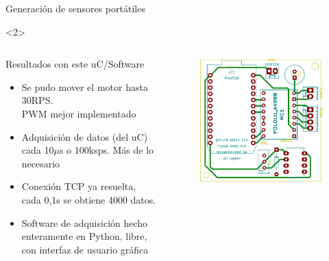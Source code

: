 \begin{frame}{Generación de sensores portátiles}
    \begin{onlyenv}<2>
        \begin{columns}
            \begin{column}{0.7\textwidth}
                \begin{block}{Resultados con este uC/Software}
                    \begin{itemize}
                        \item Se pudo mover el motor hasta 30RPS. \\PWM mejor implementado
                        \item Adquisición de datos (del uC) cada 10$\mu$s o 100ksps. Más de lo necesario
                        \item Conexión TCP ya resuelta, cada 0,1s se obtiene 4000 datos. 
                        \item Software de adquisición hecho enteramente en Python, libre, con interfaz de usuario gráfica
                    \end{itemize}
                \end{block}
            \end{column}
            \begin{column}{0.3\textwidth}
                \begin{figure}
                    \includegraphics[width=\textwidth]{fig/circuito/circuito_labo7_color}
                    \label{fig:circuito/circuito_labo7_color}
                \end{figure}
            \end{column}
        \end{columns}
    \end{onlyenv}

\end{frame}


